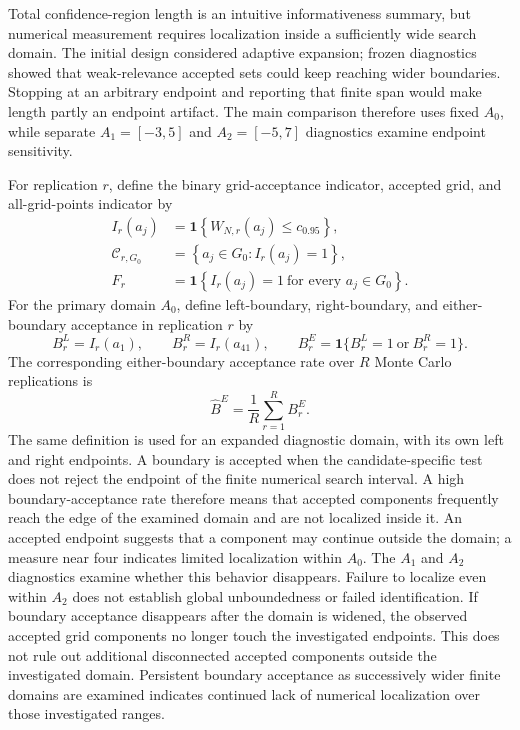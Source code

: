 Total confidence-region length is an intuitive informativeness summary, but numerical measurement requires localization inside a sufficiently wide search domain. The initial design considered adaptive expansion; frozen diagnostics showed that weak-relevance accepted sets could keep reaching wider boundaries. Stopping at an arbitrary endpoint and reporting that finite span would make length partly an endpoint artifact. The main comparison therefore uses fixed $A_0$, while separate $A_1=[-3,5]$ and $A_2=[-5,7]$ diagnostics examine endpoint sensitivity.

For replication $r$, define the binary grid-acceptance indicator, accepted grid, and all-grid-points indicator by
\begin{equation}
  \begin{aligned}
    I_r(a_j)
      &=\mathbf{1}\!\left\{W_{N,r}(a_j)\leq c_{0.95}\right\}, \\
    \mathcal{C}_{r,G_0}
      &=\left\{a_j\in G_0:I_r(a_j)=1\right\}, \\
    F_r
      &=\mathbf{1}\!\left\{I_r(a_j)=1\ \text{for every }a_j\in G_0\right\}.
  \end{aligned}
  \label{eq:grid-acceptance}
\end{equation}
For the primary domain $A_0$, define left-boundary, right-boundary, and either-boundary acceptance in replication $r$ by
\begin{equation}
  B_r^{L}=I_r(a_1),\qquad
  B_r^{R}=I_r(a_{41}),\qquad
  B_r^{E}=\mathbf{1}\{B_r^{L}=1\ \text{or}\ B_r^{R}=1\}.
  \label{eq:boundary-acceptance}
\end{equation}
The corresponding either-boundary acceptance rate over $R$ Monte Carlo replications is
\begin{equation}
  \widehat B^{E}
  =\frac{1}{R}\sum_{r=1}^{R}B_r^{E}.
  \label{eq:boundary-acceptance-rate}
\end{equation}
The same definition is used for an expanded diagnostic domain, with its own left and right endpoints. A boundary is accepted when the candidate-specific test does not reject the endpoint of the finite numerical search interval. A high boundary-acceptance rate therefore means that accepted components frequently reach the edge of the examined domain and are not localized inside it. An accepted endpoint suggests that a component may continue outside the domain; a measure near four indicates limited localization within $A_0$. The $A_1$ and $A_2$ diagnostics examine whether this behavior disappears. Failure to localize even within $A_2$ does not establish global unboundedness or failed identification. If boundary acceptance disappears after the domain is widened, the observed accepted grid components no longer touch the investigated endpoints. This does not rule out additional disconnected accepted components outside the investigated domain. Persistent boundary acceptance as successively wider finite domains are examined indicates continued lack of numerical localization over those investigated ranges.


